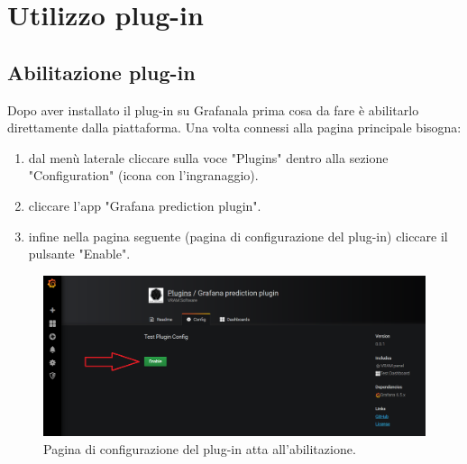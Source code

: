\section{Utilizzo plug-in}
    \subsection{Abilitazione plug-in}
        Dopo aver installato il plug-in su Grafana\glosp la prima cosa da fare è abilitarlo direttamente dalla piattaforma. Una volta connessi alla pagina principale bisogna:
        \begin{enumerate}
            \item dal menù laterale cliccare sulla voce "Plugins" dentro alla sezione "Configuration" (icona con l'ingranaggio).
            \item cliccare l'app "Grafana prediction plugin".
            \item infine nella pagina seguente (pagina di configurazione del plug-in) cliccare il pulsante "Enable".
        \end{enumerate}
        \begin{figure}[H]
            \includegraphics[width=\textwidth,height=\textheight,keepaspectratio]{img/abilitazione_plug-in.png}
            \caption{Pagina di configurazione del plug-in atta all'abilitazione.}
        \end{figure}
